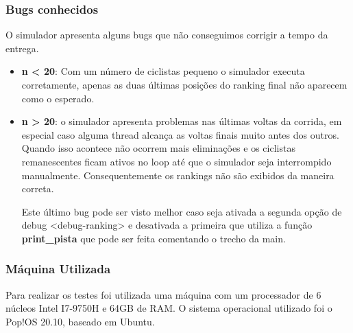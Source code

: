 \documentclass{beamer}
\begin{document}
\begin{frame}
\frametitle{Bugs conhecidos}
O simulador apresenta alguns bugs que não conseguimos corrigir a tempo da entrega. 

\begin{itemize}
\item \textbf{n < 20}: Com um número de ciclistas pequeno o simulador executa corretamente, apenas as duas últimas
    posições do ranking final não aparecem como o esperado.

\item \textbf{n > 20}: o simulador apresenta problemas nas últimas voltas da corrida, em especial caso alguma thread
    alcança as voltas finais muito antes dos outros. Quando isso acontece não ocorrem mais eliminações e os ciclistas
        remanescentes ficam ativos no loop até que o simulador seja interrompido manualmente. Consequentemente os
        rankings não são exibidos da maneira correta. 

Este último bug pode ser visto melhor caso seja ativada a segunda opção de debug <debug-ranking> e desativada a primeira
        que utiliza a função \textbf{print\_pista} que pode ser feita comentando o trecho da main.

\end{itemize}

\end{frame}


\begin{frame}
\frametitle{Máquina Utilizada}
Para realizar os testes foi utilizada uma máquina com um processador de 6 núcleos Intel I7-9750H e 64GB de RAM. O
    sistema operacional utilizado foi o Pop!OS 20.10, baseado em Ubuntu.

\end{frame}
\end{document}
